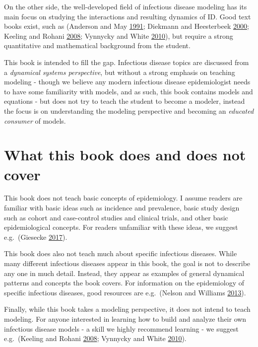 \documentclass[
]{book}
\begin{document}
On the other side, the well-developed field of infectious disease modeling has its main focus on studying the interactions and resulting dynamics of ID. Good text books exist, such as (Anderson and May \protect\hyperlink{ref-anderson91}{1991}; Diekmann and Heesterbeek \protect\hyperlink{ref-diekmann00}{2000}; Keeling and Rohani \protect\hyperlink{ref-keeling08}{2008}; Vynnycky and White \protect\hyperlink{ref-vynnycky10}{2010}), but require a strong quantitative and mathematical background from the student.

This book is intended to fill the gap. Infectious disease topics are discussed from a \emph{dynamical systems perspective}, but without a strong emphasis on teaching modeling - though we believe any modern infectious disease epidemiologist needs to have some familiarity with models, and as such, this book contains models and equations - but does not try to teach the student to become a modeler, instead the focus is on understanding the modeling perspective and becoming an \emph{educated consumer} of models.

\hypertarget{what-this-book-does-and-does-not-cover}{%
\section{What this book does and does not cover}\label{what-this-book-does-and-does-not-cover}}

This book does not teach basic concepts of epidemiology. I assume readers are familiar with basic ideas such as incidence and prevalence, basic study design such as cohort and case-control studies and clinical trials, and other basic epidemiological concepts. For readers unfamiliar with these ideas, we suggest e.g.~(Giesecke \protect\hyperlink{ref-giesecke17}{2017}).

This book does also not teach much about specific infectious diseases. While many different infectious diseases appear in this book, the goal is not to describe any one in much detail. Instead, they appear as examples of general dynamical patterns and concepts the book covers. For information on the epidemiology of specific infectious diseases, good resources are e.g.~(Nelson and Williams \protect\hyperlink{ref-nelson13}{2013}).

Finally, while this book takes a modeling perspective, it does not intend to teach modeling. For anyone interested in learning how to build and analyze their own infectious disease models - a skill we highly recommend learning - we suggest e.g.~(Keeling and Rohani \protect\hyperlink{ref-keeling08}{2008}; Vynnycky and White \protect\hyperlink{ref-vynnycky10}{2010}).
\end{document}

